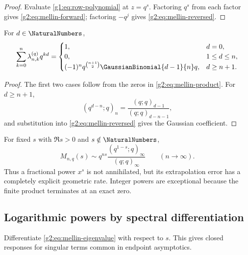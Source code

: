 \begin{proof}
Evaluate \eqref{g1:eq:row-polynomial} at $z=q^s$.  Factoring $q^s$ from
each factor gives \eqref{g2:eq:mellin-forward}; factoring $-q^j$ gives
\eqref{g2:eq:mellin-reversed}.
\end{proof}

\begin{corollary}
\label{g2:cor:integer-moments}
For $d\in\NaturalNumbers$,
\begin{equation}
 \sum_{k=0}^n\lambda_{n,k}^{(q)}q^{kd}
 =\begin{cases}
 1,&d=0,\\
 0,&1\le d\le n,\\
 (-1)^nq^{\binom{n+1}{2}}\GaussianBinomial{d-1}{n}q,&d\ge n+1.
 \end{cases}
 \label{g2:eq:integer-moment-law}
\end{equation}
\end{corollary}

\begin{proof}
The first two cases follow from the zeros in
\eqref{g2:eq:mellin-product}.  For $d\ge n+1$,
\[
 (q^{d-n};q)_n=\frac{(q;q)_{d-1}}{(q;q)_{d-n-1}},
\]
and substitution into \eqref{g2:eq:mellin-reversed} gives the Gaussian
coefficient.
\end{proof}

\begin{remark}
For fixed $s$ with $\Re s>0$ and $s\notin\NaturalNumbers$,
\begin{equation}
 M_{n,q}(s)
 \sim q^{ns}\frac{(q^{1-s};q)_\infty}{(q;q)_\infty}
 \qquad(n\to\infty).
 \label{g2:eq:fractional-asymptotic}
\end{equation}
Thus a fractional power $x^s$ is not annihilated, but its extrapolation error
has a completely explicit geometric rate.  Integer powers are exceptional
because the finite product terminates at an exact zero.
\end{remark}

\subsection{Logarithmic powers by spectral differentiation}

Differentiate \eqref{g2:eq:mellin-eigenvalue} with respect to $s$.  This gives
closed responses for singular terms common in endpoint asymptotics.

